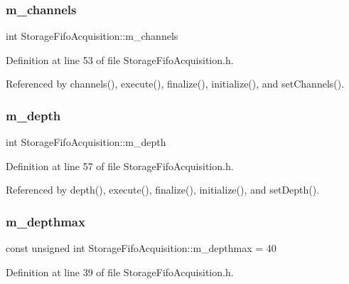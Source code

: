 \subsubsection{\texorpdfstring{m\+\_\+channels}{m\_channels}}
{\footnotesize\ttfamily int Storage\+Fifo\+Acquisition\+::m\+\_\+channels\hspace{0.3cm}{\ttfamily [private]}}



Definition at line 53 of file Storage\+Fifo\+Acquisition.\+h.



Referenced by channels(), execute(), finalize(), initialize(), and set\+Channels().

\mbox{\label{classStorageFifoAcquisition_a6bebf76cce0ccaae599c844a69ebd19d}} 
\subsubsection{\texorpdfstring{m\+\_\+depth}{m\_depth}}
{\footnotesize\ttfamily int Storage\+Fifo\+Acquisition\+::m\+\_\+depth\hspace{0.3cm}{\ttfamily [private]}}



Definition at line 57 of file Storage\+Fifo\+Acquisition.\+h.



Referenced by depth(), execute(), finalize(), initialize(), and set\+Depth().

\mbox{\label{classStorageFifoAcquisition_a2f3ce0569ee9ec4fa78ec66a9cbe6ed7}} 
\subsubsection{\texorpdfstring{m\+\_\+depthmax}{m\_depthmax}}
{\footnotesize\ttfamily const unsigned int Storage\+Fifo\+Acquisition\+::m\+\_\+depthmax = 40\hspace{0.3cm}{\ttfamily [static]}}



Definition at line 39 of file Storage\+Fifo\+Acquisition.\+h.



